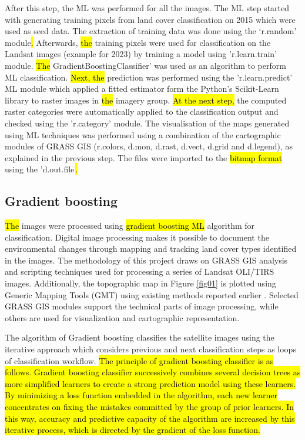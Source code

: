 \documentclass[jimaging,article,submit,pdftex,moreauthors]{Definitions/mdpi}
\begin{document}
After this step, the ML was performed for all the images. The ML step started with generating training pixels from land cover classification on 2015 which were used as seed data. The extraction of training data was done using the ‘r.random’ module\hl{. }Afterwards, \hl{the} training pixels were used for classification on the Landsat images (example for 2023) by training a model using 'r.learn.train' module. \hl{The} GradientBoostingClassifier’ was used as an algorithm to perform ML classification. \hl{Next, the} prediction was performed using the 'r.learn.predict' ML module\hl{ }which applied a fitted estimator form the Python's Scikit-Learn library \cite{pedregosa2018} to raster images in \hl{the} imagery group.\hl{ At the next step, }the computed raster categories were automatically applied to the classification output and checked using the 'r.category' module. The visualisation of the maps generated using ML techniques was performed using a combination of the cartographic modules of GRASS GIS (r.colors, d.mon, d.rast, d.vect, d.grid and d.legend), as explained in the previous step. The files were imported to the \hl{bitmap format} using the 'd.out.file'\hl{.} 

\subsection{Gradient boosting}

\hl{The} images were\hl{ }processed using \hl{gradient boosting ML} algorithm for classification. Digital image processing makes it possible to document the environmental changes through mapping and tracking land cover types identified in the images. The methodology of this project draws on GRASS GIS analysis and scripting techniques used for processing a series of Landsat OLI/TIRS images. Additionally, the topographic map in Figure \ref{fig01} is plotted using Generic Mapping Tools (GMT) using existing methods reported earlier \cite{WRIGHT1998737,Lemenkova202217,9921513,Lemenkova202203,10537274}. Selected GRASS GIS modules support the technical parts of image processing, while others are used for visualization and cartographic representation.

The algorithm of Gradient boosting classifies the satellite images using the iterative approach which considers previous and next classification steps as loops of classification workflow. \hl{The principle of gradient boosting classifier is as follows. Gradient boosting classifier successively combines several decision trees as more simplified learners to create a strong prediction model using these learners.  By minimizing a loss function embedded in the algorithm, each new learner concentrates on fixing the mistakes committed by the group of prior learners. In this way, accuracy and predictive capacity of the algorithm are increased by this iterative process, which is directed by the gradient of the loss function.}
\end{document}
